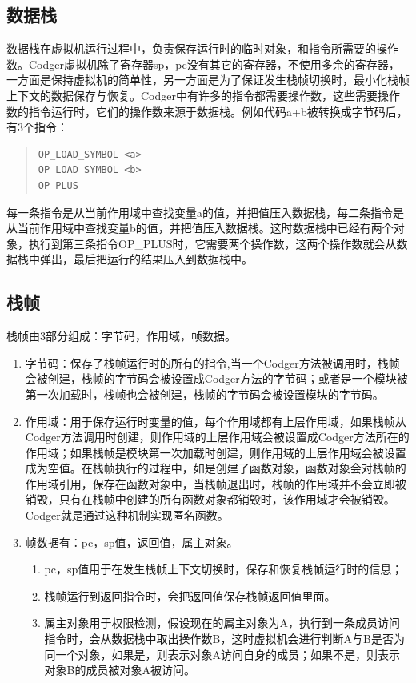 \subsection{数据栈}
数据栈在虚拟机运行过程中，负责保存运行时的临时对象，和指令所需要的操作数。Codger虚拟机除了寄存器sp，pc没有其它的寄存器，不使用多余的寄存器，一方面是保持虚拟机的简单性，另一方面是为了保证发生栈帧切换时，最小化栈帧上下文的数据保存与恢复。Codger中有许多的指令都需要操作数，这些需要操作数的指令运行时，它们的操作数来源于数据栈。例如代码a+b被转换成字节码后，有3个指令：
\begin{quote}
\begin{verbatim}
OP_LOAD_SYMBOL <a>
OP_LOAD_SYMBOL <b>
OP_PLUS
\end{verbatim}
\end{quote}
每一条指令是从当前作用域中查找变量a的值，并把值压入数据栈，每二条指令是从当前作用域中查找变量b的值，并把值压入数据栈。这时数据栈中已经有两个对象，执行到第三条指令OP\_PLUS时，它需要两个操作数，这两个操作数就会从数据栈中弹出，最后把运行的结果压入到数据栈中。
\subsection{栈帧}
栈帧由3部分组成：字节码，作用域，帧数据。
\begin{enumerate}
\item 字节码：保存了栈帧运行时的所有的指令,当一个Codger方法被调用时，栈帧会被创建，栈帧的字节码会被设置成Codger方法的字节码；或者是一个模块被第一次加载时，栈帧也会被创建，栈帧的字节码会被设置模块的字节码。
\item 作用域：用于保存运行时变量的值，每个作用域都有上层作用域，如果栈帧从Codger方法调用时创建，则作用域的上层作用域会被设置成Codger方法所在的作用域；如果栈帧是模块第一次加载时创建，则作用域的上层作用域会被设置成为空值。在栈帧执行的过程中，如是创建了函数对象，函数对象会对栈帧的作用域引用，保存在函数对象中，当栈帧退出时，栈帧的作用域并不会立即被销毁，只有在栈帧中创建的所有函数对象都销毁时，该作用域才会被销毁。Codger就是通过这种机制实现匿名函数。
\item 帧数据有：pc，sp值，返回值，属主对象。
\begin{enumerate}
\item pc，sp值用于在发生栈帧上下文切换时，保存和恢复栈帧运行时的信息；
\item 栈帧运行到返回指令时，会把返回值保存栈帧返回值里面。
\item 属主对象用于权限检测，假设现在的属主对象为A，执行到一条成员访问指令时，会从数据栈中取出操作数B，这时虚拟机会进行判断A与B是否为同一个对象，如果是，则表示对象A访问自身的成员；如果不是，则表示对象B的成员被对象A被访问。
\end{enumerate}
\end{enumerate}
